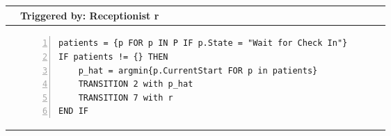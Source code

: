 \begin{tabular}{@{}>{\raggedright\arraybackslash}p{0.25cm}>{\raggedright\arraybackslash}p{13cm}@{}}
  \toprule
   & Triggered by: Receptionist r\\ \midrule 
  &
\vspace{-12pt}
\begin{Verbatim}[numbers=left]
patients = {p FOR p IN P IF p.State = "Wait for Check In"}
IF patients != {} THEN 
    p_hat = argmin{p.CurrentStart FOR p in patients}
    TRANSITION 2 with p_hat
    TRANSITION 7 with r
END IF
  \end{Verbatim}
  \\ \bottomrule
  \end{tabular}